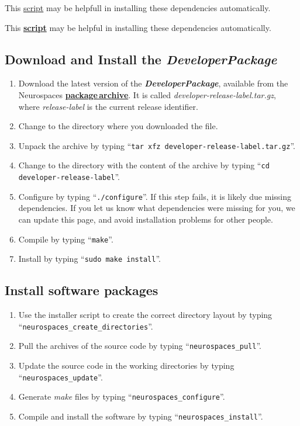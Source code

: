 \documentclass[12pt]{article}
\begin{document}
This \href{scripts/install-dependencies.sh}{script} may be helpfull in installing these dependencies automatically.

This \href{scripts/install-dependencies.sh}{\bf script} may be helpful in installing these dependencies automatically.

\subsection*{Download and Install the {\bf{\emph{DeveloperPackage}}}}

\begin{enumerate}
   \item Download the latest version of the {\bf{\emph{DeveloperPackage}}}, available from the Neurospaces \href{http://repo-genesis3.cbi.utsa.edu/src/}{\bf package\,archive}. It is called {\it developer-release-label.tar.gz}, where {\it release-label} is the current release identifier.
   \item Change to the directory where you downloaded the file.
   \item Unpack the archive by typing ``{\tt tar xfz developer-release-label.tar.gz}''.
   \item Change to the directory with the content of the archive by typing ``{\tt cd developer-release-label}''.
   \item Configure by typing ``{\tt ./configure}''.  If this step fails, it is likely due missing dependencies.  If you let us know what dependencies were missing for you, we can update this page, and avoid installation problems for other people.
   \item Compile by typing ``{\tt make}''.
   \item Install by typing ``{\tt sudo make install}''. 
\end{enumerate}

\subsection*{Install software packages}

\begin{enumerate}
   \item Use the installer script to create the correct directory layout by typing ``{\tt neurospaces\_create\_directories}''.
   \item Pull the archives of the source code by typing ``{\tt neurospaces\_pull}''.
   \item Update the source code in the working directories by typing ``{\tt neurospaces\_update}''.
   \item Generate {\it make} files by typing ``{\tt neurospaces\_configure}''.
   \item Compile and install the software by typing ``{\tt neurospaces\_install}''.
\end{enumerate}
\end{document}
